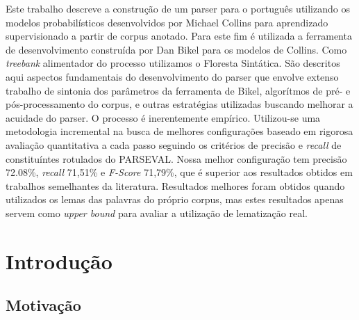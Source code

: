\documentclass[a4paper]{abnt}
\begin{document}


\pagestyle{plain}


\begin{resumo}
Este trabalho descreve a construção de um parser para o português utilizando os modelos probabilísticos desenvolvidos por Michael Collins para aprendizado supervisionado a partir de corpus anotado. 
Para este fim é utilizada a ferramenta de desenvolvimento construída por Dan Bikel para os modelos de Collins. 
Como \emph{treebank} alimentador do processo utilizamos o Floresta Sintática.
São descritos aqui aspectos fundamentais do desenvolvimento do parser que envolve extenso trabalho de sintonia dos parâmetros da ferramenta de Bikel, algorítmos de pré- e pós-processamento do corpus, e outras estratégias utilizadas buscando melhorar a acuidade do parser. 
O processo é inerentemente empírico. Utilizou-se uma metodologia incremental na busca de melhores configurações baseado em rigorosa avaliação quantitativa a cada passo seguindo os critérios de precisão e \emph{recall} de constituíntes rotulados do PARSEVAL. 
Nossa melhor configuração tem precisão 72.08{\%}, \emph{recall} 71,51{\%} e \emph{F-Score} 71,79{\%}, que é superior aos resultados obtidos em trabalhos semelhantes da literatura. Resultados melhores foram obtidos quando utilizados os lemas das palavras do próprio corpus, mas estes resultados apenas servem como \emph{upper bound} para avaliar a utilização de lematização real.

\end{resumo}

\tableofcontents
\listoffigures
\listoftables

%


\setcounter{page}{0}

\chapter{Introdução}
\label{cha:introducao}
\thispagestyle{empty}
    

\section{Motivação}
\label{sec:motivacao}
	
\end{document}
